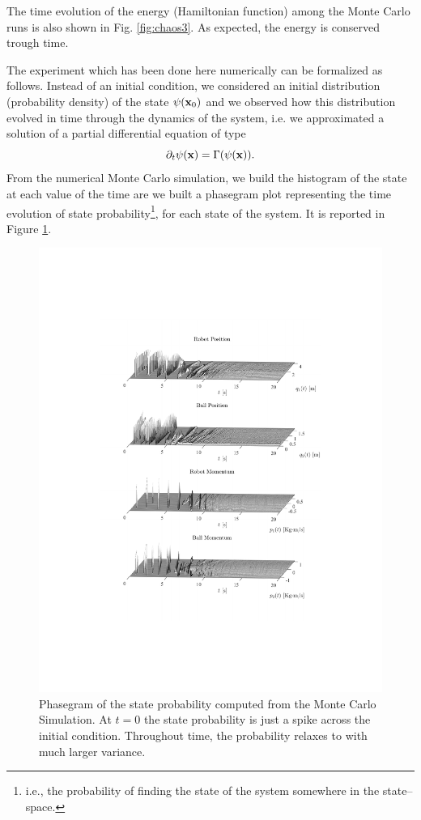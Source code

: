 The time evolution of the energy (Hamiltonian function) among the Monte Carlo runs is also shown in Fig. \ref{fig:chaos3}. As expected, the energy is conserved trough time.
%

%
The experiment which has been done here numerically can be formalized as follows.
Instead of an initial condition, we considered an initial distribution (probability density) of the state $\psi(\mathbf{x}_0)$ and we observed how this distribution evolved in time through the dynamics of the system, i.e. we approximated a solution of a partial differential equation of type
%
\begin{equation}
    \partial_t\psi(\mathbf{x}) = \Gamma(\psi(\mathbf{x})).
\end{equation}
%
From the numerical Monte Carlo simulation, we build the histogram of the state at each value of the time are we built a phasegram plot representing the time evolution of state probability\footnote{i.e., the probability of finding the state of the system somewhere in the state--space.}, for each state of the system. It is reported in Figure \ref{fig:phasegram}. 
%
\begin{figure}[!ht]
    \centering
    \includegraphics[width = 1\linewidth, trim={5cm 5.75cm 3.9cm 5.5cm},clip]{Figures/PhaseGram.pdf}
    \caption[Phasegram of the state probability function]{Phasegram of the state probability computed from the Monte Carlo Simulation. At $t=0$ the state probability is just a spike across the initial condition. Throughout time, the probability relaxes to with much larger variance.}
    \label{fig:phasegram}
\end{figure}
